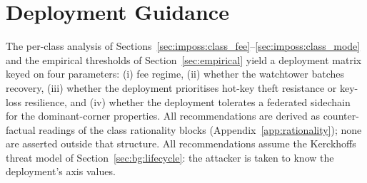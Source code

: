 
\section{Deployment Guidance}
\label{sec:deployment}

The per-class analysis of Sections~\ref{sec:imposs:class_fee}--\ref{sec:imposs:class_mode}
and the empirical thresholds of Section~\ref{sec:empirical} yield a
deployment matrix keyed on four parameters: (i) fee regime, (ii)
whether the watchtower batches recovery, (iii) whether the deployment
prioritises hot-key theft resistance or key-loss resilience, and (iv)
whether the deployment tolerates a federated sidechain for the
dominant-corner properties. All recommendations are derived as
counter-factual readings of the class rationality blocks
(Appendix~\ref{app:rationality}); none are asserted outside that
structure. All recommendations assume the Kerckhoffs threat model of
Section~\ref{sec:bg:lifecycle}: the attacker is taken to know the
deployment's axis values.

